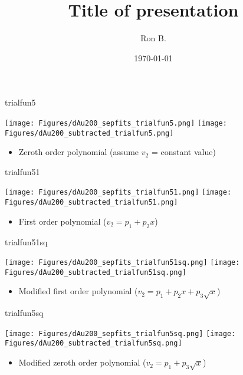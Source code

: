 \documentclass[aspectratio=169,compress,10pt]{beamer}
\title[Title of presentation]{Title of presentation}
\author[Ron B.]{Ron B.}
\institute[UNCG]{\normalsize University of North Carolina Greensboro}
\date[\today]{\today}
\begin{document}


\begin{frame}{trialfun5}
\begin{center}
\texttt{[image: Figures/dAu200\_sepfits\_trialfun5.png]}
\texttt{[image: Figures/dAu200\_subtracted\_trialfun5.png]}
\end{center}
\begin{itemize}
\item Zeroth order polynomial (assume $v_2$ = constant value)
\end{itemize}
\end{frame}




\begin{frame}{trialfun51}
\begin{center}
\texttt{[image: Figures/dAu200\_sepfits\_trialfun51.png]}
\texttt{[image: Figures/dAu200\_subtracted\_trialfun51.png]}
\end{center}
\begin{itemize}
\item First order polynomial ($v_2 = p_1 + p_2x$)
\end{itemize}
\end{frame}




\begin{frame}{trialfun51sq}
\begin{center}
\texttt{[image: Figures/dAu200\_sepfits\_trialfun51sq.png]}
\texttt{[image: Figures/dAu200\_subtracted\_trialfun51sq.png]}
\end{center}
\begin{itemize}
\item Modified first order polynomial ($v_2 = p_1 + p_2x + p_3\sqrt{x}$)
\end{itemize}
\end{frame}



\begin{frame}{trialfun5sq}
\begin{center}
\texttt{[image: Figures/dAu200\_sepfits\_trialfun5sq.png]}
\texttt{[image: Figures/dAu200\_subtracted\_trialfun5sq.png]}
\end{center}
\begin{itemize}
\item Modified zeroth order polynomial ($v_2 = p_1  + p_3\sqrt{x}$)
\end{itemize}
\end{frame}
\end{document}
